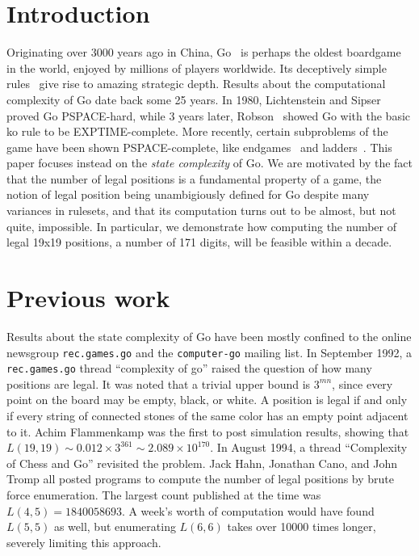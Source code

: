 \documentclass{article}
\begin{document}
\section{Introduction}
Originating over 3000 years ago in China,
Go~\cite{gowiki} is perhaps the oldest boardgame in the world,
enjoyed by millions of players worldwide.
Its deceptively simple rules~\cite{gorules}
give rise to amazing strategic depth.
Results about the computational complexity of Go
date back some 25 years. In 1980, Lichtenstein and Sipser~\cite{LS80}
proved Go PSPACE-hard, while 3 years later, Robson~\cite{R83}
showed Go with the basic ko rule to be EXPTIME-complete. More recently,
certain subproblems of the game have been shown PSPACE-complete,
like endgames~\cite{W02} and ladders~\cite{CT00}.
This paper focuses instead on the {\em state complexity} of Go.
We are motivated by the fact that
the number of legal positions is a fundamental property of a game,
the notion of legal position being unambigiously defined for Go
despite many variances in rulesets, and that its computation turns
out to be almost, but not quite, impossible. In particular, we
demonstrate how computing the number of legal 19x19 positions,
a number of 171 digits, will be feasible within a decade.

\section{Previous work}
Results about the state complexity of Go have been mostly confined
to the online newsgroup {\tt rec.games.go} and the {\tt computer-go}
mailing list.
In September 1992, a {\tt rec.games.go} thread ``complexity of go''
raised the question of how many positions are legal.
It was noted that a trivial upper bound is $3^{mn}$,
since every point on the board may be empty, black,
or white. A position is legal if and only if every string of
connected stones of the same color has an empty point adjacent to it.
Achim Flammenkamp was the first to post simulation results, showing
that $L(19,19) \sim 0.012 \times 3^{361} \sim 2.089 \times 10^{170}$.
In August 1994, a thread ``Complexity of Chess and Go'' revisited the problem.
Jack Hahn, Jonathan Cano, and John Tromp all posted programs to compute the
number of legal positions by brute force enumeration.
The largest count published at the time was $L(4,5)=1840058693$.
A week's worth of computation would have found $L(5,5)$ as well,
but enumerating $L(6,6)$ takes over 10000 times longer, severely
limiting this approach.
\end{document}
